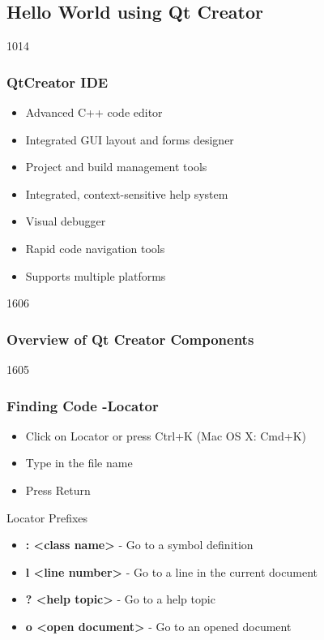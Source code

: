 \subsection{Hello World using Qt Creator}

\begin{slide}{1014}\frametitle{QtCreator IDE} \label{qtcreator}
\begin{itemize}
  \item Advanced C++ code editor
  \item Integrated GUI layout and forms designer
  \item Project and build management tools
  \item Integrated, context-sensitive help system
  \item Visual debugger
  \item Rapid code navigation tools
  \item Supports multiple platforms
  \end{itemize}                   
\end{slide}


\begin{slide}{1606}
  \frametitle{Overview of Qt Creator Components}
\end{slide}

\begin{slide}{1605}
  \frametitle{Finding Code -Locator}
 \begin{itemize}
  \item Click on Locator or press Ctrl+K (Mac OS X: Cmd+K)
 \item Type in the file name
 \item Press Return
 \end{itemize}
 \newline
 Locator Prefixes
 \begin{itemize}
 \item \textbf{: <class name>} - Go to a symbol definition
 \item \textbf{l <line number> } - Go to a line in the current document
 \item \textbf{? <help topic>} - Go to a help topic
 \item \textbf{o <open document>} - Go to an opened document
 \end{itemize}
\end{slide}

